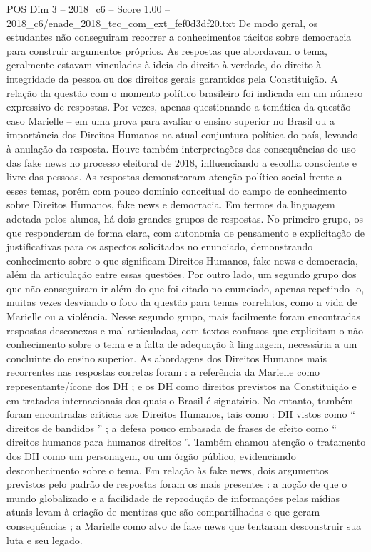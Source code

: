 \begin{textsample}{POS Dim 3 – 2018\_c6 – Score 1.00 – 2018\_c6/enade\_2018\_tec\_com\_ext\_fef0d3df20.txt}
De modo geral, os estudantes não conseguiram recorrer a conhecimentos tácitos sobre democracia para construir argumentos próprios.
As respostas que abordavam o tema, geralmente estavam vinculadas à ideia do direito à verdade, do direito à integridade da pessoa ou dos direitos gerais garantidos pela Constituição.
A relação da questão com o momento político brasileiro foi indicada em um número expressivo de respostas.
Por vezes, apenas questionando a temática da questão – caso Marielle – em uma prova para avaliar o ensino superior no Brasil ou a importância dos Direitos Humanos na atual conjuntura política do país, levando à anulação da resposta.
Houve também interpretações das consequências do uso das fake news no processo eleitoral de 2018, influenciando a escolha consciente e livre das pessoas.
As respostas demonstraram atenção político social frente a esses temas, porém com pouco domínio conceitual do campo de conhecimento sobre Direitos Humanos, fake news e democracia.
Em termos da linguagem adotada pelos alunos, há dois grandes grupos de respostas.
No primeiro grupo, os que responderam de forma clara, com autonomia de pensamento e explicitação de justificativas para os aspectos solicitados no enunciado, demonstrando conhecimento sobre o que significam Direitos Humanos, fake news e democracia, além da articulação entre essas questões.
Por outro lado, um segundo grupo dos que não conseguiram ir além do que foi citado no enunciado, apenas repetindo -o, muitas vezes desviando o foco da questão para temas correlatos, como a vida de Marielle ou a violência.
Nesse segundo grupo, mais facilmente foram encontradas respostas desconexas e mal articuladas, com textos confusos que explicitam o não conhecimento sobre o tema e a falta de adequação à linguagem, necessária a um concluinte do ensino superior.
As abordagens dos Direitos Humanos mais recorrentes nas respostas corretas foram : a referência da Marielle como representante/ícone dos DH ; e os DH como direitos previstos na Constituição e em tratados internacionais dos quais o Brasil é signatário.
No entanto, também foram encontradas críticas aos Direitos Humanos, tais como : DH vistos como “ direitos de bandidos ” ; a defesa pouco embasada de frases de efeito como “ direitos humanos para humanos direitos ”.
Também chamou atenção o tratamento dos DH como um personagem, ou um órgão público, evidenciando desconhecimento sobre o tema.
Em relação às fake news, dois argumentos previstos pelo padrão de respostas foram os mais presentes : a noção de que o mundo globalizado e a facilidade de reprodução de informações pelas mídias atuais levam à criação de mentiras que são compartilhadas e que geram consequências ; a Marielle como alvo de fake news que tentaram desconstruir sua luta e seu legado.

\end{textsample}
